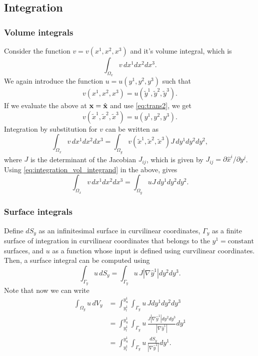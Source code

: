 \documentclass[11pt]{article}
\newcommand{\xtilde}{\tilde{x}}
\newcommand{\ytilde}{\tilde{y}}
\begin{document}
\subsection{Integration}

\subsubsection{Volume integrals}
Consider the function $v = v(x^1, x^2, x^3)$ and it's volume integral, which is
\begin{equation}
    \int_{\Omega_x} v \, dx^1 dx^2 dx^3.
\end{equation}
We again introduce the function $u = u(y^1, y^2, y^3)$ such that
\begin{equation}
    v(x^1, x^2, x^3) = u(\ytilde^1, \ytilde^2, \ytilde^3).
\end{equation}
If we evaluate the above at $\mathbf{x} = \hat{\mathbf{x}}$ and use \cref{eq:trans2}, we get
\begin{equation}
    \label{eq:integration_vol_integrand}
    v(\xtilde^1, \xtilde^2, \xtilde^3) = u(y^1, y^2, y^3).
\end{equation}
Integration by substitution for $v$ can be written as
\begin{equation}
    \int_{\Omega_x} v \, dx^1 dx^2 dx^3 = \int_{\Omega_y} v(\xtilde^1, \xtilde^2, \xtilde^3) J \, dy^1 dy^2 dy^2,
\end{equation}
where $J$ is the determinant of the Jacobian $J_{ij}$, which is given by $J_{ij} = \partial \hat{x}^i / \partial y^j$.
Using \cref{eq:integration_vol_integrand} in the above, gives
\begin{equation}
    \int_{\Omega_x} v \, dx^1 dx^2 dx^3 = \int_{\Omega_y} u J \, dy^1 dy^2 dy^2.
\end{equation}

\subsubsection{Surface integrals}
Define $d S_y$ as an infinitesimal surface in curvilinear coordinates, $\Gamma_y$ as a finite surface of integration in curvilinear coordinates that belongs to the $y^1 = \text{constant}$ surfaces, and $u$ as a function whose input is defined using curvilinear coordinates. Then, a surface integral can be computed using 
\begin{equation}
    \int_{\Gamma_y} u \, d S_y = \int_{\Gamma_y} u \, J | \nabla \hat{y}^1| dy^2 dy^3.
\end{equation}
Note that now we can write
\begin{align}
\label{eq:int_from_vol_surf}
    \int_{\Omega_y} u \,dV_y &= \int_{y^1_l}^{y^1_u} \int_{\Gamma_y} u \, J dy^1 dy^2 dy^3 \nonumber \\
    &= \int_{y^1_l}^{y^1_u} \int_{\Gamma_y} u \, \frac{J | \nabla \hat{y}^1| dy^2 dy^3}{| \nabla \hat{y}^1 |} dy^1 \nonumber \\
    &= \int_{y^1_l}^{y^1_u} \int_{\Gamma_y} u \, \frac{dS_y}{|\nabla \hat{y}^1|} dy^1.
\end{align}
\end{document}

